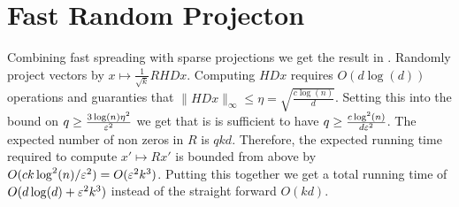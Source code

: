 \documentclass{article}
\begin{document}
\section{Fast Random Projecton}

Combining fast spreading with sparse projections  we get the result in \cite{AilonCh06}.
Randomly project vectors by $x \mapsto \frac{1}{\sqrt{k}}RHDx$.
Computing $HDx$ requires $O(d\log(d))$ operations and guaranties that $\|HDx\|_\infty \le \eta = \sqrt{\frac{c\log(n)}{d}}$.
Setting this into the bound on $q \ge \frac{3\log(n)\eta^2}{\varepsilon^2}$ we get that is is sufficient to 
have $q \ge \frac{c\log^2(n)}{d\varepsilon^2}$. The expected number of non zeros in $R$ is $qkd$.
Therefore, the expected running time required to compute $x' \mapsto Rx'$ is bounded from above by
$O(ck\log^2(n)/\varepsilon^2) = O(\varepsilon^2 k^3)$.
Putting this together we get a total running time of $O(d\log(d) + \varepsilon^2 k^3)$ instead of the straight forward $O(kd)$. 



\end{document}
